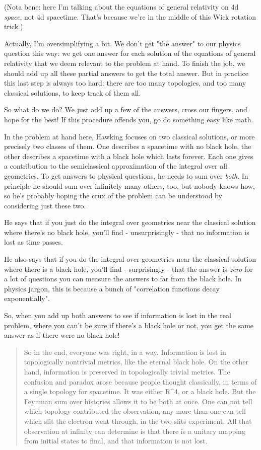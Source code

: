 (Nota bene: here I'm talking about the equations of general relativity
on 4d \emph{space}, not 4d spacetime.  That's because we're in the middle
of this Wick rotation trick.)

Actually, I'm oversimplifying a bit.  We don't get "the answer" to
our physics question this way: we get one answer for each solution 
of the equations of general relativity that we deem relevant to the 
problem at hand.  To finish the job, we should add up all these partial
answers to get the total answer.  But in practice this last step is 
always too hard: there are too many topologies, and too many classical
solutions, to keep track of them all.

So what do we do?  We just add up a few of the answers, cross our 
fingers, and hope for the best!  If this procedure offends you, go 
do something easy like math.

In the problem at hand here, Hawking focuses on two classical solutions,
or more precisely two classes of them.  One describes a spacetime with no 
black hole, the other describes a spacetime with a black hole which lasts
forever.  Each one gives a contribution to the semiclassical approximation 
of the integral over all geometries.  To get answers to physical questions, 
he needs to sum over \emph{both}.   
In principle he should sum over infinitely 
many others, too, but nobody knows how, so he's probably hoping the crux 
of the problem can be understood by considering just these two.   

He says that if you just do the integral over geometries near the
classical solution where there's no black hole, you'll find - 
unsurprisingly - that no information is lost as time passes.

He also says that if you do the integral over geometries near the
classical solution where there is a black hole, you'll find -
surprisingly - that the answer is \emph{zero} for a lot of questions 
you can measure the answers to far from the black hole.  In physics 
jargon, this is because a bunch of "correlation functions decay 
exponentially".

So, when you add up both answers to see if information is lost in the
real problem, where you can't be sure if there's a black hole or not,
you get the same answer as if there were no black hole!  

\begin{quote}
     So in the end, everyone was right, in a way.  Information is lost 
     in topologically nontrivial metrics, like the eternal black hole. 
     On the other hand, information is preserved in topologically trivial
     metrics. The confusion and paradox arose because people thought
     classically, in terms of a single topology for spacetime.  It was
     either R^{4}, or a black hole.  But the Feynman sum over histories allows
     it to be both at once.  One can not tell which topology contributed the
     observation, any more than one can tell which slit the electron went
     through, in the two slits experiment.  All that observation at infinity
     can determine is that there is a unitary mapping from initial states
     to final, and that information is not lost.
\end{quote}

